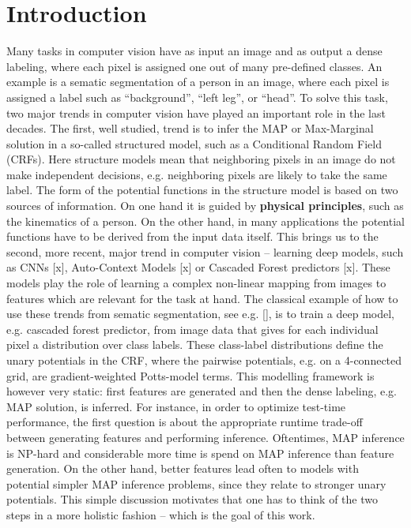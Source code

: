 \documentclass[10pt,twocolumn,letterpaper]{article}
\begin{document}
\section{Introduction}
Many tasks in computer vision have as input an image and as output a dense labeling, where each pixel is assigned one out of many pre-defined classes. An example is a sematic segmentation of a person in an image, where each pixel is assigned a label such as “background”, “left leg”, or “head”. 
To solve this task, two major trends in computer vision have played an important role in the last decades.  The first, well studied, trend is to infer the MAP or Max-Marginal solution in a so-called structured model, such as a Conditional Random Field (CRFs). Here structure models mean that neighboring pixels in an image do not make independent decisions, e.g. neighboring pixels are likely to take the same label. The form of the potential functions in the structure model is based on two sources of information.  On one hand it is guided by {\bf physical principles}, such as the kinematics of a person. On the other hand, in many applications the potential functions have to be derived from the input data itself. This brings us to the second, more recent, major trend in computer vision – learning deep models, such as CNNs [x], Auto-Context Models [x] or Cascaded Forest predictors [x]. These models play the role of learning a complex non-linear mapping from images to features which are relevant for the task at hand. 
The classical example of how to use these trends from sematic segmentation, see e.g. [], is to train a deep model, e.g. cascaded forest predictor, from image data that gives for each individual pixel a distribution over class labels. These class-label distributions define the unary potentials in the CRF, where the pairwise potentials, e.g. on a 4-connected grid, are gradient-weighted Potts-model terms. This modelling framework is however very static: first features are generated and then the dense labeling, e.g. MAP solution, is inferred. For instance, in order to optimize test-time performance, the first question is about the appropriate runtime trade-off between generating features and performing inference. Oftentimes, MAP inference is NP-hard and considerable more time is spend on MAP inference than feature generation. On the other hand, better features lead often to models with potential simpler MAP inference problems, since they relate to stronger unary potentials. This simple discussion motivates that one has to think of the two steps in a more holistic fashion – which is the goal of this work.
\end{document}
